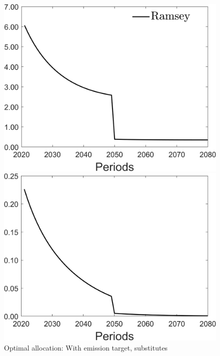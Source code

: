 \begin{figure}[h!!]
	\centering
	\caption{Optimal allocation: With emission target, substitutes }\label{fig:optallo_subst_onlyR_target}
	\begin{minipage}[]{0.32\textwidth}
		\includegraphics[width=1\textwidth]{../../codding_model/Own/figures/Rep_agent/staticonlyRam_separate_c_periods59_eppsilon4.00_zeta1.40_Ad08_Ac04_thetac0.70_thetad0.56_HetGrowth1_tauul0.181_util0_withtarget1_lgd1.png}
	\end{minipage}
	\begin{minipage}[]{0.32\textwidth}
		\includegraphics[width=1\textwidth]{../../codding_model/Own/figures/Rep_agent/staticonlyRam_separate_hh_periods59_eppsilon4.00_zeta1.40_Ad08_Ac04_thetac0.70_thetad0.56_HetGrowth1_tauul0.181_util0_withtarget1_lgd0.png}

\end{minipage}
\end{figure}
